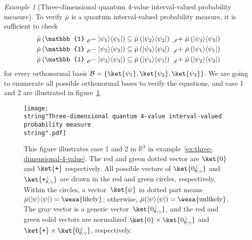 \documentclass{article}
\theoremstyle{remark}
\newtheorem{example}{Example}
\newcommand{\proj}[1]{|#1 \rangle\langle #1 |}
\newcommand{\ps}{\texttt{+}}
\newcommand{\likely}{{\mbox{\wesa{likely}}}}
\newcommand{\unlikely}{{\mbox{\wesa{unlikely}}}}
\begin{document}
\begin{example}[Three-dimensional quantum 4-value interval-valued
probability measure]
To verify $\bar{\mu}$ is a quantum interval-valued probability measure,
it is sufficient to check 
\begin{equation}
\begin{aligned}\bar{\mu}\left(\mathbb{1}\tensor*[_{\mathscr{O}}]{-}{}\proj{\psi_{1}}\right) & \subseteq\bar{\mu}\left(\proj{\psi_{2}}\right)\tensor*[_{\mathscr{I}}]{+}{}\bar{\mu}\left(\proj{\psi_{3}}\right)\\
\bar{\mu}\left(\mathbb{1}\tensor*[_{\mathscr{O}}]{-}{}\proj{\psi_{2}}\right) & \subseteq\bar{\mu}\left(\proj{\psi_{3}}\right)\tensor*[_{\mathscr{I}}]{+}{}\bar{\mu}\left(\proj{\psi_{1}}\right)\\
\bar{\mu}\left(\mathbb{1}\tensor*[_{\mathscr{O}}]{-}{}\proj{\psi_{3}}\right) & \subseteq\bar{\mu}\left(\proj{\psi_{1}}\right)\tensor*[_{\mathscr{I}}]{+}{}\bar{\mu}\left(\proj{\psi_{2}}\right)
\end{aligned}
\label{eq:non-additive-vectors}
\end{equation}
for every orthonormal basis $\mathcal{B}=\left\{ \ket{\psi_{1}},\ket{\psi_{2}},\ket{\psi_{3}}\right\} $.
We are going to enumerate all possible orthonormal bases to verify
the equations, and case 1 and 2 are illustrated in figure~\ref{fig:three-dimensional-4-value}.
\begin{figure}
\texttt{[image: \\string"Three-dimensional quantum 4-value interval-valued probability measure\\string".pdf]}\caption{\label{fig:three-dimensional-4-value}This figure illustrates case
1 and 2 in $\mathbb{R}^{3}$ in example~\ref{ex:three-dimensional-4-value}.
The red and green dotted vector are $\ket{0}$ and $\ket{\ps}$ respectively.
All possible vectors of $\ket{0_{\theta,\gamma}^{\perp}}$ and $\ket{\ps_{\theta,\gamma}^{\perp}}$
are drawn in the red and green circles, respectively. Within the circles,
a vector~$\ket{\psi}$ in dotted part means $\bar{\mu}(\proj{\psi})=\likely$;
otherwise, $\bar{\mu}(\proj{\psi})=\unlikely$. The gray vector is
a generic vector~$\ket{0_{\theta,\gamma}^{\perp}}$, and the red
and green solid vectors are normalized $\ket{0}\times\ket{0_{\theta,\gamma}^{\perp}}$
and $\ket{\ps}\times\ket{0_{\theta,\gamma}^{\perp}}$, respectively.}
\end{figure}


\end{example}
\end{document}
